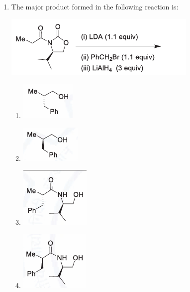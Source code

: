 \documentclass[journal,12pt,onecolumn]{IEEEtran}
\begin{document}
\begin{enumerate}
    \item The major product formed in the following reaction is:
    \begin{center}
    \includegraphics[width=0.8\columnwidth]{figs/q49.png}
    \end{center}
    \begin{multicols}{2}
    \begin{enumerate}
        \item \includegraphics[width=0.4\columnwidth]{figs/q49a.png}
        \item \includegraphics[width=0.4\columnwidth]{figs/q49b.png}
        \item \includegraphics[width=0.4\columnwidth]{figs/q49c.png}
        \item \includegraphics[width=0.4\columnwidth]{figs/q49d.png}
    \end{enumerate}
    \end{multicols}
    \hfill{}


\end{enumerate}
\end{document}
